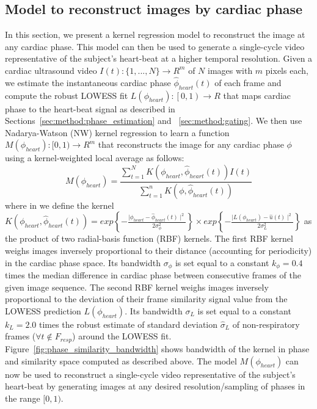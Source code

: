 \documentclass[journal]{IEEEtran}
\begin{document}
\subsection{Model to reconstruct images by cardiac phase}
\label{sec:method:super_resolution}
%
In this section, we present a kernel regression model to reconstruct the image at any cardiac phase. This model can then be used to generate a single-cycle video representative of the subject's heart-beat at a higher temporal resolution. Given a cardiac ultrasound video $I(t) : \{1, ..., N\} \to R^m$ of $N$ images with $m$ pixels each, we estimate the instantaneous cardiac phase $\hat{\phi}_{heart}(t)$ of each frame and compute the robust LOWESS fit $L(\phi_{heart}) : \left [  0, 1\right ) \to R$ that maps cardiac phase to the heart-beat signal as described in Sections~\ref{sec:method:phase_estimation} and ~\ref{sec:method:gating}. We then use Nadarya-Watson (NW) kernel regression \cite{Bishop2006} to learn a function $M(\phi_{heart}): [0, 1) \to R^m $ that reconstructs the image for any cardiac phase $\phi$ using a kernel-weighted local average as follows:
\begin{equation}
M(\phi_{heart}) = \frac{\sum_{t = 1}^{N} K \left( \phi_{heart}, \hat{\phi}_{heart}(t) \right) I(t)}{\sum_{t = 1}^{n} K \left( \phi, \hat{\phi}_{heart}(t) \right)} 
\end{equation}
where in we define the kernel $K\left( \phi_{heart}, \hat{\phi}_{heart}(t) \right) = exp\left \{ -\frac{ \mid \phi_{heart} - \hat{\phi}_{heart}(t) \mid^2}{2  \sigma^2_\phi} \right \} \times exp\left \{ -\frac{ \mid L(\phi_{heart}) - \hat{u}(t) \mid^2}{2  \sigma^2_{L}} \right \}$ as the product of two radial-basis function (RBF) kernels. The first RBF kernel  weighs images inversely proportional to their distance (accounting for periodicity) in the cardiac phase space. Its bandwidth $\sigma_\phi$ is set equal to a constant $k_\phi = 0.4$ times the median difference in cardiac phase between consecutive frames of the given image sequence. The second RBF kernel weighs images inversely proportional to the deviation of their frame similarity signal value from the LOWESS prediction $L(\phi_{heart})$. Its bandwidth $\sigma_{L}$ is set equal to a constant $k_L = 2.0$ times the robust estimate of standard deviation $\hat{\sigma}_{L}$ of non-respiratory frames ($\forall t \notin F_{resp}$) around the LOWESS fit. Figure~\ref{fig:phase_similarity_bandwidth} shows bandwidth of the kernel in phase and similarity space computed as described above. The model $M(\phi_{heart})$ can now be used to reconstruct a single-cycle video representative of the subject's heart-beat by generating images at any desired resolution/sampling of phases in the range $[0, 1)$. 
%
\end{document}

